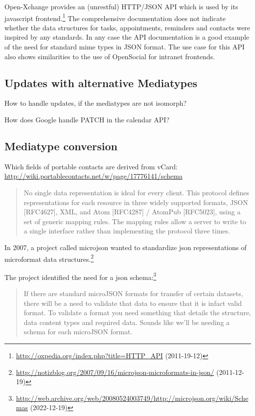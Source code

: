 \documentclass[12pt,a4paper]{scrartcl}		%
\newcommand{\citeurl}[2]{\url{#1} (#2)}
\begin{document}
Open-Xchange provides an (unrestful) HTTP/JSON API which is used by its
javascript
frontend.\footnote{\citeurl{http://oxpedia.org/index.php?title=HTTP_API}{2011-19-12}}
The comprehensive documentation does not indicate whether the data structures
for tasks, appointments, reminders and contacts were inspired by any
standards. In any case the API documentation is a good example of the need for
standard mime types in JSON format. The use case for this API also shows
similarities to the use of OpenSocial for intranet frontends.

\subsection{Updates with alternative Mediatypes}
How to handle updates, if the mediatypes are not isomorph?

How does Google handle PATCH in the calendar API?

\subsection{Mediatype conversion}

Which fields of portable contacts are derived from vCard: \url{http://wiki.portablecontacts.net/w/page/17776141/schema}

\begin{quote}
  No single data representation is ideal for every client. This protocol defines representations for each resource in three widely supported formats, JSON [RFC4627], XML, and Atom [RFC4287] / AtomPub [RFC5023], using a set of generic mapping rules. The mapping rules allow a server to write to a single interface rather than implementing the protocol three times.
\end{quote}\cite[Core API Server]{OSSpec2.0.1}



In 2007, a project called microjson wanted to standardize json representations of microformat data structures.\footnote{\citeurl{http://notizblog.org/2007/09/16/microjson-microformats-in-json/}{2011-12-19}} 

The project identified the need for a json schema:\footnote{\citeurl{http://web.archive.org/web/20080524003749/http://microjson.org/wiki/Schemas}{2022-12-19}}
\begin{quote}
  If there are standard microJSON formats for transfer of certain datasets, there will be a need to validate that data to ensure that it is infact valid format. To validate a format you need something that details the structure, data content types and required data. Sounds like we'll be needing a schema for each microJSON format. 
\end{quote}
\end{document}
